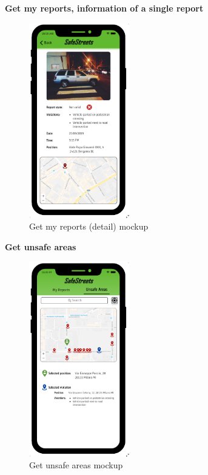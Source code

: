 					\begin{center}
						{\small \textbf{Get my reports, information of a single report}}
					\end{center}
					\vspace{-5mm}
					\begin{figure}[!h]
						\centering
						\includegraphics[height=8.5cm]{images/MockUp/User/MyReportExpanded.pdf}
						\caption{Get my reports (detail) mockup}
					\end{figure}
					\vspace{-1mm}
					\begin{center}
						{\small \textbf{Get unsafe areas}}
					\end{center}
					\vspace{-5mm}
					\begin{figure}[!h]
						\centering
						\includegraphics[height=8.5cm]{images/MockUp/User/UnsafeAreas.pdf}
						\caption{Get unsafe areas mockup}
					\end{figure}
					\clearpage
					
